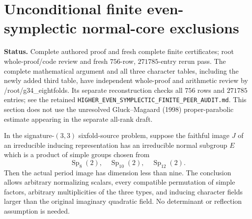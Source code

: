 \section{Unconditional finite even-symplectic normal-core exclusions}
\label{sec:higher-even-symplectic-finite}

\noindent\textbf{Status.} Complete authored proof and fresh complete finite
certificates; root whole-proof/code review and fresh $756$-row,
$271785$-entry rerun pass. The complete mathematical argument and all three character tables,
including the newly added third table, have independent whole-proof and
arithmetic review by /root/g34\_eightfolds. Its separate reconstruction
checks all $756$ rows and $271785$ entries; see the retained
\texttt{HIGHER\_EVEN\_SYMPLECTIC\_FINITE\_PEER\_AUDIT.md}. This section does not use the unresolved Gluck--Magaard (1998)
proper-parabolic estimate appearing in the separate all-rank draft.

\begin{theorem}
In the signature-$(3,3)$ sixfold-source problem, suppose the faithful image
$J$ of an irreducible inducing representation has an irreducible normal
subgroup $E$ which is a product of simple groups chosen from
\[
          \operatorname{Sp}_8(2),\quad \operatorname{Sp}_{10}(2),
                         \quad \operatorname{Sp}_{12}(2).
\]
Then the actual period image has dimension less than nine. The conclusion
allows arbitrary normalizing scalars, every compatible permutation of
simple factors, arbitrary multiplicities of the three types, and inducing
character fields larger than the original imaginary quadratic field.
No determinant or reflection assumption is needed.
\end{theorem}

